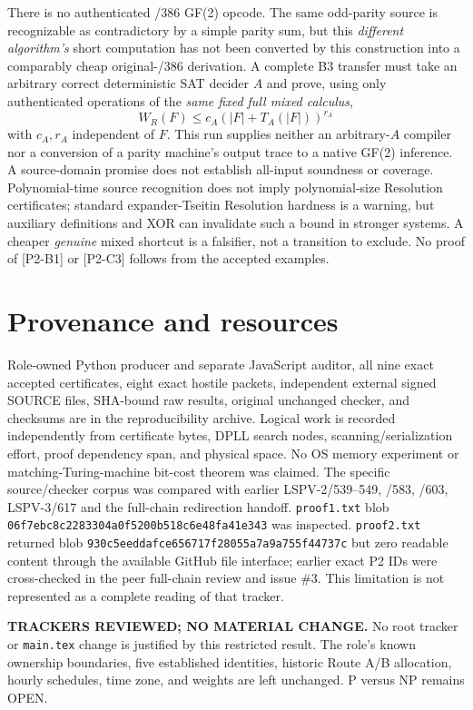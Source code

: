 \documentclass[11pt]{article}
\begin{document}
There is no authenticated /386 GF(2) opcode. The same odd-parity source is recognizable as contradictory by a simple parity sum, but this \emph{different algorithm's} short computation has not been converted by this construction into a comparably cheap original-/386 derivation. A complete B3 transfer must take an arbitrary correct deterministic SAT decider $A$ and prove, using only authenticated operations of the \emph{same fixed full mixed calculus},
\[
W_R(F)\le c_A(|F|+T_A(|F|))^{r_A}
\]
with $c_A,r_A$ independent of $F$. This run supplies neither an arbitrary-$A$ compiler nor a conversion of a parity machine's output trace to a native GF(2) inference. A source-domain promise does not establish all-input soundness or coverage. Polynomial-time source recognition does not imply polynomial-size Resolution certificates; standard expander-Tseitin Resolution hardness is a warning, but auxiliary definitions and XOR can invalidate such a bound in stronger systems. A cheaper \emph{genuine} mixed shortcut is a falsifier, not a transition to exclude. No proof of [P2-B1] or [P2-C3] follows from the accepted examples.

\section*{Provenance and resources}
Role-owned Python producer and separate JavaScript auditor, all nine exact accepted certificates, eight exact hostile packets, independent external signed SOURCE files, SHA-bound raw results, original unchanged checker, and checksums are in the reproducibility archive. Logical work is recorded independently from certificate bytes, DPLL search nodes, scanning/serialization effort, proof dependency span, and physical space. No OS memory experiment or matching-Turing-machine bit-cost theorem was claimed. The specific source/checker corpus was compared with earlier LSPV-2/539--549, /583, /603, LSPV-3/617 and the full-chain redirection handoff. \texttt{proof1.txt} blob \texttt{06f7ebc8c2283304a0f5200b518c6e48fa41e343} was inspected. \texttt{proof2.txt} returned blob \texttt{930c5eeddafce656717f28055a7a9a755f44737c} but zero readable content through the available GitHub file interface; earlier exact P2 IDs were cross-checked in the peer full-chain review and issue \#3. This limitation is not represented as a complete reading of that tracker.

\noindent\textbf{TRACKERS REVIEWED; NO MATERIAL CHANGE.} No root tracker or \texttt{main.tex} change is justified by this restricted result. The role's known ownership boundaries, five established identities, historic Route A/B allocation, hourly schedules, time zone, and weights are left unchanged. P versus NP remains OPEN.
\end{document}
